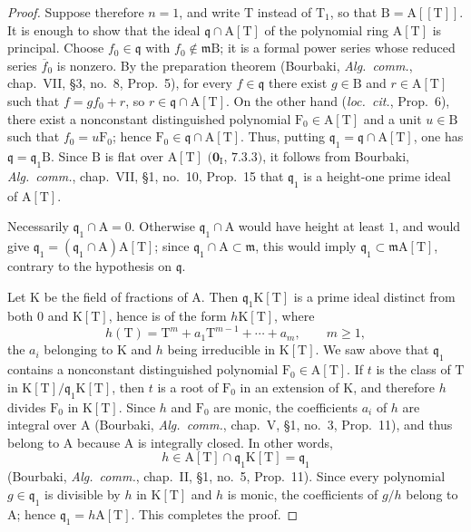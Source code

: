 \begin{proof}
Suppose therefore $n=1$, and write $\mathrm{T}$ instead of $\mathrm{T}_1$, so that $\mathrm{B}=\mathrm{A}[[\mathrm{T}]]$. It is enough to show that the ideal $\mathfrak{q}\cap\mathrm{A}[\mathrm{T}]$ of the polynomial ring $\mathrm{A}[\mathrm{T}]$ is principal.
Choose $f_0\in\mathfrak{q}$ with $f_0\notin\mathfrak{m}\mathrm{B}$; it is a formal power series whose reduced series $\overline{f}_0$ is nonzero. By the preparation theorem (Bourbaki, \emph{Alg.\ comm.}, chap.~VII, \S3, no.~8, Prop.~5), for every $f\in\mathfrak{q}$ there exist $g\in\mathrm{B}$ and $r\in\mathrm{A}[\mathrm{T}]$ such that $f=gf_0+r$, so $r\in\mathfrak{q}\cap\mathrm{A}[\mathrm{T}]$. On the other hand (\emph{loc.\ cit.}, Prop.~6), there exist a nonconstant distinguished polynomial $\mathrm{F}_0\in\mathrm{A}[\mathrm{T}]$ and a unit $u\in\mathrm{B}$ such that $f_0=u\mathrm{F}_0$; hence $\mathrm{F}_0\in\mathfrak{q}\cap\mathrm{A}[\mathrm{T}]$. Thus, putting $\mathfrak{q}_1=\mathfrak{q}\cap\mathrm{A}[\mathrm{T}]$, one has $\mathfrak{q}=\mathfrak{q}_1\mathrm{B}$. Since $\mathrm{B}$ is flat over $\mathrm{A}[\mathrm{T}]$ $(\mathbf{0}_{\mathrm{I}}$, $7.3.3)$, it follows from Bourbaki, \emph{Alg.\ comm.}, chap.~VII, \S1, no.~10, Prop.~15 that $\mathfrak{q}_1$ is a height-one prime ideal of $\mathrm{A}[\mathrm{T}]$.

Necessarily $\mathfrak{q}_1\cap\mathrm{A}=0$. Otherwise $\mathfrak{q}_1\cap\mathrm{A}$ would have height at least $1$, and  would give $\mathfrak{q}_1=(\mathfrak{q}_1\cap\mathrm{A})\mathrm{A}[\mathrm{T}]$; since $\mathfrak{q}_1\cap\mathrm{A}\subset\mathfrak{m}$, this would imply $\mathfrak{q}_1\subset\mathfrak{m}\mathrm{A}[\mathrm{T}]$, contrary to the hypothesis on $\mathfrak{q}$.

Let $\mathrm{K}$ be the field of fractions of $\mathrm{A}$. Then $\mathfrak{q}_1\mathrm{K}[\mathrm{T}]$ is a prime ideal distinct from both $0$ and $\mathrm{K}[\mathrm{T}]$, hence is of the form $h\mathrm{K}[\mathrm{T}]$, where
\[
  h(\mathrm{T})=\mathrm{T}^m+a_1\mathrm{T}^{m-1}+\cdots+a_m,
  \qquad m\geq1,
\]
the $a_i$ belonging to $\mathrm{K}$ and $h$ being irreducible in $\mathrm{K}[\mathrm{T}]$. We saw above that $\mathfrak{q}_1$ contains a nonconstant distinguished polynomial $\mathrm{F}_0\in\mathrm{A}[\mathrm{T}]$. If $t$ is the class of $\mathrm{T}$ in $\mathrm{K}[\mathrm{T}]/\mathfrak{q}_1\mathrm{K}[\mathrm{T}]$, then $t$ is a root of $\mathrm{F}_0$ in an extension of $\mathrm{K}$, and therefore $h$ divides $\mathrm{F}_0$ in $\mathrm{K}[\mathrm{T}]$. Since $h$ and $\mathrm{F}_0$ are monic, the coefficients $a_i$ of $h$ are integral over $\mathrm{A}$ (Bourbaki, \emph{Alg.\ comm.}, chap.~V, \S1, no.~3, Prop.~11), and thus belong to $\mathrm{A}$ because $\mathrm{A}$ is integrally closed. In other words,
\[
  h\in\mathrm{A}[\mathrm{T}]\cap\mathfrak{q}_1\mathrm{K}[\mathrm{T}]=\mathfrak{q}_1
\]
(Bourbaki, \emph{Alg.\ comm.}, chap.~II, \S1, no.~5, Prop.~11). Since every polynomial $g\in\mathfrak{q}_1$ is divisible by $h$ in $\mathrm{K}[\mathrm{T}]$ and $h$ is monic, the coefficients of $g/h$ belong to $\mathrm{A}$; hence $\mathfrak{q}_1=h\mathrm{A}[\mathrm{T}]$. This completes the proof.
\end{proof}

